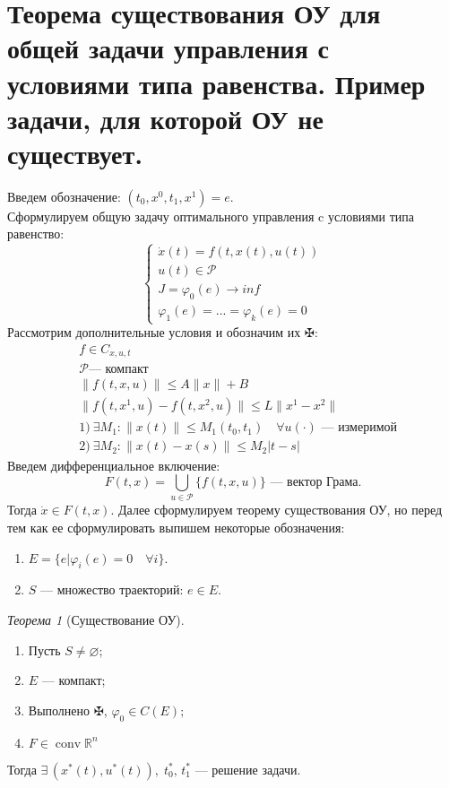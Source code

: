 \documentclass[oneside, final, 14pt, draft]{article}
\theoremstyle{definition}
\theoremstyle{definition}
\theoremstyle{remark}
\theoremstyle{theorem}
\newtheorem{thm}{Теорема}[section]
\DeclareMathOperator{\conv}{conv}
\renewcommand{\phi}{\varphi}
\renewcommand{\leq}{\leqslant}
\begin{document}
\section{Теорема существования ОУ для общей задачи управления с условиями типа равенства. Пример задачи, для которой ОУ не существует.}
Введем обозначение: $(t_0, x^0, t_1, x^1) = e$.\\
Сформулируем общую задачу оптимального управления c условиями типа равенство:
$$
\begin{cases}
    \dot{x}(t) = f(t, x(t), u(t))\\
    u(t) \in \mathcal{P}\\
    J = \varphi_0(e) \rightarrow inf\\
    \varphi_1(e) = ... = \varphi_k(e) = 0
\end{cases}
$$
Рассмотрим дополнительные условия и обозначим их $\maltese$:
$$
\begin{aligned}
    &f \in C_{x, u, t}\\
    &\mathcal{P} \text{--- компакт}\\
    &\|f(t, x, u)\| \leq A\|x\| +B\\
    &\|f(t, x^1, u)- f(t, x^2, u)\| \leq L \|x^1 - x^2\|\\
    &1) \ \exists M_1: \|x(t)\| \leq M_1(t_0, t_1) \quad \forall u(\cdot) \text{ --- измеримой}\\
    &2)\  \exists M_2: \|x(t)- x(s)\| \leq M_2|t-s| \quad 
\end{aligned}
$$
Введем дифференциальное включение: $$F(t, x) = \bigcup\limits_{u\in \mathcal{P}} \{f(t, x, u)\}\text{ --- вектор Грама}.$$ Тогда $\dot{x} \in F(t, x) .$
Далее сформулируем теорему существования ОУ, но перед тем как ее сформулировать выпишем некоторые обозначения:
\begin{enumerate}
\item $E = \{\left. e \right| \phi_i(e) = 0\quad \forall i\}$.
\item $S$ --- множество траекторий: $e \in E$.
\end{enumerate}
\begin{thm}[Существование ОУ]\ 
\begin{enumerate}
\item Пусть $S \neq \varnothing$;
\item $E$ --- компакт;
\item Выполнено $\maltese$, $\phi_0 \in C(E);$
\item $F \in \conv \mathbb{R}^n$
\end{enumerate}
Тогда $\exists\, (x^*(t), u^*(t)),\; t_0^*,\, t_1^*$ --- решение задачи.
\end{thm}
\end{document}
